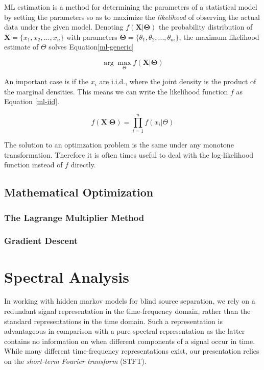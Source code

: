 \documentclass[11pt, oneside, a4paper]{report}
\begin{document}
ML estimation is a method for determining the parameters of a
statistical model by setting the parameters so as to maximize the
\emph{likelihood} of observing the actual data under the given
model. Denoting $f(\boldsymbol{X}|\boldsymbol{\Theta})$ the
probability distribution of $\boldsymbol{X} = \{x_1,x_2,...,x_n\}$
with parameters $\boldsymbol{\Theta} = \{\theta_1, \theta_2, ...,
\theta_m\}$, the maximum likelihood estimate of $\Theta$ solves Equation\ref{ml-generic}

\begin{equation}
  \label{ml-generic}
  \arg \max_\Theta f(\boldsymbol{X}|\boldsymbol{\Theta})
\end{equation}

An important case is if the $x_i$ are i.i.d., where the joint density
is the product of the marginal densities. This means we can write the
likelihood function $f$ as Equation \ref{ml-iid}.

\begin{equation}  
  \label{ml-iid}
  f(\boldsymbol{X}|\boldsymbol{\Theta}) = \prod_{i = 1}^n f(x_i|\Theta)
\end{equation}

The solution to an optimzation problem is the same under any monotone transformation. Therefore it is often times useful to deal with the log-likelihood function instead of $f$ directly.


\subsection{Mathematical Optimization}\label{optimization}

\subsubsection{The Lagrange Multiplier Method}

\subsubsection{Gradient Descent}


\section{Spectral Analysis}

In working with hidden markov models for blind source separation, we
rely on a redundant signal representation in the time-frequency
domain, rather than the standard representations in the time
domain. Such a representation is advantageous in comparison with a
pure spectral representation as the latter contains no information on
when different components of a signal occur in time. While many
different time-frequency representations exist, our presentation
relies on the \emph{short-term Fourier transform} (STFT).
\end{document}
